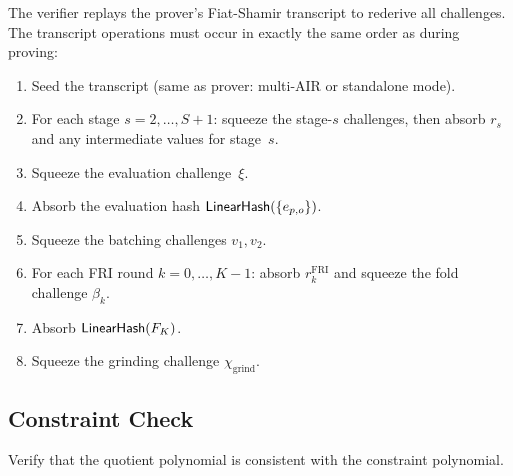 The verifier replays the prover's Fiat-Shamir transcript to rederive all challenges.
The transcript operations must occur in exactly the same order as during proving:

\begin{enumerate}[label=(\roman*)]
  \item Seed the transcript (same as prover: multi-AIR or standalone mode).

  \item For each stage $s = 2, \ldots, S+1$:
        squeeze the stage-$s$ challenges, then absorb $r_s$ and any
        intermediate values for stage~$s$.

  \item Squeeze the evaluation challenge~$\xi$.

  \item Absorb the evaluation hash $\textsf{LinearHash}(\{e_{p,o}\})$.

  \item Squeeze the batching challenges $v_1, v_2$.

  \item For each FRI round $k = 0, \ldots, K-1$:
        absorb $r_k^{\mathrm{FRI}}$ and squeeze the fold challenge $\beta_k$.

  \item Absorb $\textsf{LinearHash}(F_K)$.

  \item Squeeze the grinding challenge $\chi_{\mathrm{grind}}$.
\end{enumerate}

\subsection{Constraint Check}
\label{sec:constraint-check}

Verify that the quotient polynomial is consistent with the constraint polynomial.

